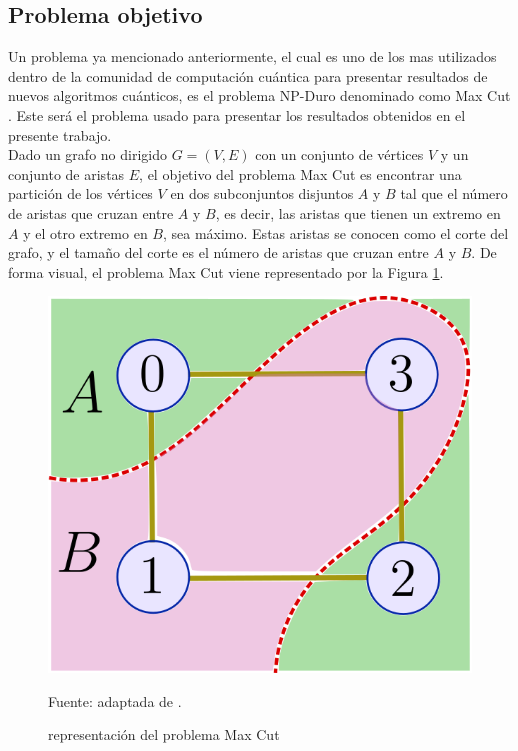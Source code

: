 \subsection{Problema objetivo}
\label{sub:problem_target}

Un problema ya mencionado anteriormente, el cual es uno de los mas utilizados dentro de la comunidad de computación cuántica para presentar resultados de nuevos algoritmos cuánticos, es el problema NP-Duro denominado como Max Cut \citep{heal}. Este será el problema usado para presentar los resultados obtenidos en el presente trabajo. \\

Dado un grafo no dirigido $ G = (V, E) $ con un conjunto de vértices $ V $ y un conjunto de aristas $ E $, el objetivo del problema Max Cut es encontrar una partición de los vértices $ V $ en dos subconjuntos disjuntos $ A $ y $ B $ tal que el número de aristas que cruzan entre $ A $ y $ B $, es decir, las aristas que tienen un extremo en $ A $ y el otro extremo en $ B $, sea máximo. Estas aristas se conocen como el corte del grafo, y el tamaño del corte es el número de aristas que cruzan entre $ A $ y $ B $. De forma visual, el problema Max Cut viene representado por la Figura \ref{fig:max_cut_problem}. 


\begin{figure}[!h]
    \centering
    \includegraphics[scale = 0.8]{img/03-max_cut_problem.png}
    \caption{representación del problema Max Cut}
    Fuente: adaptada de \cite{pn}.
    \label{fig:max_cut_problem}
\end{figure}

